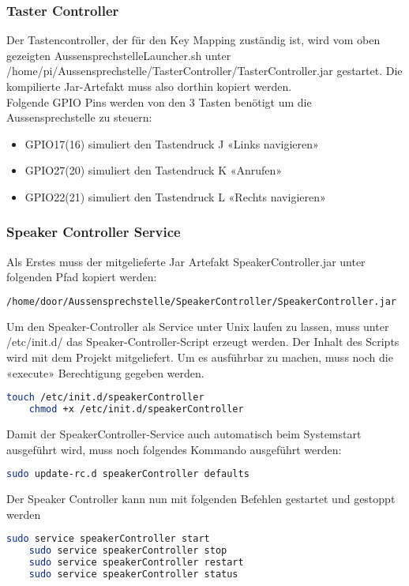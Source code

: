 \subsubsection{Taster Controller}
Der Tastencontroller, der für den Key Mapping zuständig ist, wird vom oben gezeigten AussensprechstelleLauncher.sh unter /home/pi/Aussensprechstelle/TasterController/TasterController.jar gestartet. Die kompilierte Jar-Artefakt  muss also dorthin kopiert werden. 
\\
Folgende GPIO Pins werden von den 3 Tasten benötigt um die Aussensprechstelle zu steuern:
\begin{itemize}
	\item GPIO17(16) simuliert den Tastendruck J «Links navigieren»
	\item GPIO27(20) simuliert den Tastendruck K «Anrufen»
	\item GPIO22(21) simuliert den Tastendruck L «Rechts navigieren»
\end{itemize}

\subsubsection{Speaker Controller Service}
Als Erstes muss der mitgelieferte Jar Artefakt SpeakerController.jar unter folgenden Pfad kopiert werden:
\begin{lstlisting}[backgroundcolor = \color{snippetcolor},
language = bash,
xleftmargin = 1cm,
framexleftmargin = 0.1em,
breaklines=true]
	/home/door/Aussensprechstelle/SpeakerController/SpeakerController.jar
\end{lstlisting}
Um den Speaker-Controller als Service unter Unix laufen zu lassen, muss unter /etc/init.d/ das Speaker-Controller-Script erzeugt werden. Der Inhalt des Scripts wird mit dem Projekt mitgeliefert. Um es ausführbar zu machen, muss noch die
«execute» Berechtigung gegeben werden.

\begin{lstlisting}[backgroundcolor = \color{snippetcolor},
language = bash,
xleftmargin = 1cm,
framexleftmargin = 0.1em,
breaklines=true]
	touch /etc/init.d/speakerController
	chmod +x /etc/init.d/speakerController
\end{lstlisting}
Damit der SpeakerController-Service auch automatisch beim Systemstart ausgeführt wird, muss noch folgendes Kommando ausgeführt werden:
\begin{lstlisting}[backgroundcolor = \color{snippetcolor},
language = bash,
xleftmargin = 1cm,
framexleftmargin = 0.1em,
breaklines=true]
	sudo update-rc.d speakerController defaults
\end{lstlisting}
Der Speaker Controller kann nun mit folgenden Befehlen gestartet und gestoppt werden
\begin{lstlisting}[backgroundcolor = \color{snippetcolor},
language = bash,
xleftmargin = 1cm,
framexleftmargin = 0.1em,
breaklines=true]
	sudo service speakerController start
	sudo service speakerController stop
	sudo service speakerController restart
	sudo service speakerController status
\end{lstlisting}

